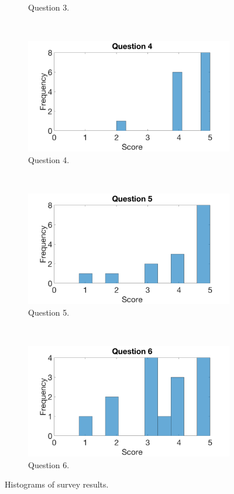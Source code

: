 \documentclass[main.tex]{subfiles}
\begin{document}
\begin{figure}[htb]
\begin{subfigure}{.47\textwidth}
				\caption{Question 3.}
				\label{fig:survey3}
		\end{subfigure}
		~
		\begin{subfigure}{.47\textwidth}
				\includegraphics[width=\textwidth]{pics/q4}
				\caption{Question 4.}
				\label{fig:survey4}
		\end{subfigure}
		\\
		\begin{subfigure}{.47\textwidth}
				\includegraphics[width=\textwidth]{pics/q5}
				\caption{Question 5.}
				\label{fig:survey5}
		\end{subfigure}
		~
		\begin{subfigure}{.47\textwidth}
				\includegraphics[width=\textwidth]{pics/q6}
				\caption{Question 6.}
				\label{fig:survey6}
		\end{subfigure}
	\caption{Histograms of survey results.}
	\label{fig:survey}
\end{figure}
\end{document}
